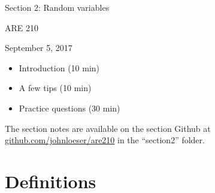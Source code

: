 \documentclass[12pt,english]{article}
\begin{document}
\begin{center}
{\Large{}Section 2: Random variables}
\par\end{center}{\Large \par}

\begin{center}
ARE 210
\par\end{center}

\begin{center}
September 5, 2017
\par\end{center}

\begin{itemize}
	\item Introduction (10 min)
	\item A few tips (10 min)
	\item Practice questions (30 min)
\end{itemize}
The section notes are available on the section Github at \href{github.com/johnloeser/eep152}{github.com/johnloeser/are210} in the ``section2'' folder.

\section{Definitions}
\end{document}
